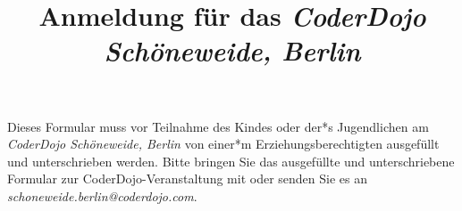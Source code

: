 \documentclass{coderdojoschoeneweide}
\title{Anmeldung für das \textit{CoderDojo Schöneweide, Berlin}}
\date{}
\begin{document}
\maketitle
\part*{}

\begin{Form}
Dieses Formular muss vor Teilnahme des Kindes oder der*s Jugendlichen am \textit{CoderDojo Schöneweide, Berlin} von einer*m Erziehungsberechtigten ausgefüllt und unterschrieben werden. Bitte bringen Sie das ausgefüllte und unterschriebene Formular zur CoderDojo-Veranstaltung mit oder senden Sie es an \textit{schoneweide.berlin@coderdojo.com}.









\end{Form}
\end{document}
